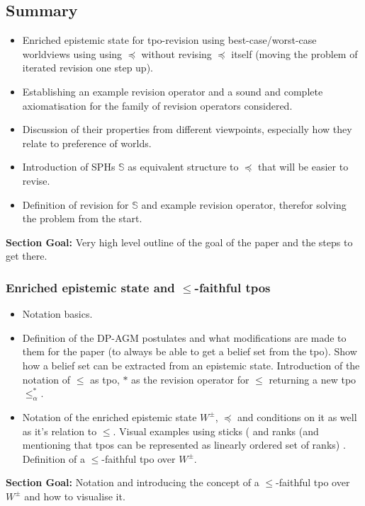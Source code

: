 \documentclass[11pt]{article}
\begin{document}
\subsection{Summary}
\begin{itemize}
    \item Enriched epistemic state for tpo-revision using best-case/worst-case worldviews using using $\preceq$ without revising $\preceq$ itself (moving the problem of iterated revision one step up).
    \item Establishing an example revision operator and a sound and complete axiomatisation for the family of revision operators considered.
    \item Discussion of their properties from different viewpoints, especially how they relate to preference of worlds.
    \item Introduction of SPHs $\mathds{S}$ as equivalent structure to $\preceq$ that will be easier to revise.
    \item Definition of revision for $\mathds{S}$ and example revision operator, therefor solving the problem from the start. 
\end{itemize}
\textbf{Section Goal:} Very high level outline of the goal of the paper and the steps to get there.

\subsubsection{Enriched epistemic state and $\leq$-faithful tpos}
\begin{itemize}
    \item Notation basics.
    \item Definition of the DP-AGM postulates and what modifications are made to them for the paper (to always be able to get a belief set from the tpo). Show how a belief set can be extracted from an epistemic state. Introduction of the notation of $\leq$ as tpo, $\ast$ as the revision operator for $\leq$ returning a new tpo $\leq^{\ast}_{\alpha}$. 
    \item Notation of the enriched epistemic state $W^{\pm}$, $\preceq$ and conditions on it as well as it's relation to $\leq$. Visual examples using sticks (\cite{Booth2011} and ranks (and mentioning that tpos can be represented as linearly ordered set of ranks) \cite{Booth2006}. Definition of a $\leq$-faithful tpo over $W^{\pm}$.
\end{itemize}
\textbf{Section Goal:} Notation and introducing the concept of a $\leq$-faithful tpo over $W^{\pm}$ and how to visualise it.
\end{document}
